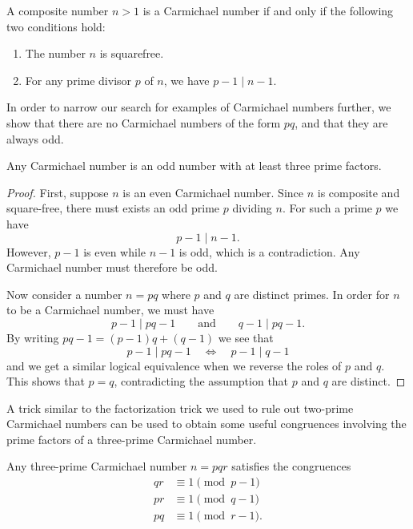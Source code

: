 \begin{theorem}
  A composite number $n>1$ is a Carmichael number if and only if the following two conditions hold:
  \begin{enumerate}
  \item The number $n$ is squarefree.
  \item For any prime divisor $p$ of $n$, we have $p-1\mid n-1$.
  \end{enumerate}
\end{theorem}

In order to narrow our search for examples of Carmichael numbers further, we show that there are no Carmichael numbers of the form $pq$, and that they are always odd.

\begin{theorem}
  Any Carmichael number is an odd number with at least three prime factors.
\end{theorem}

\begin{proof}
  First, suppose $n$ is an even Carmichael number. Since $n$ is composite and square-free, there must exists an odd prime $p$ dividing $n$. For such a prime $p$ we have
  \begin{equation*}
    p-1\mid n-1.
  \end{equation*}
  However, $p-1$ is even while $n-1$ is odd, which is a contradiction. Any Carmichael number must therefore be odd.
  
  Now consider a number $n=pq$ where $p$ and $q$ are distinct primes. In order for $n$ to be a Carmichael number, we must have
  \begin{equation*}
    p-1\mid pq-1\qquad\text{and}\qquad q-1\mid pq-1.
  \end{equation*}
  By writing $pq-1=(p-1)q + (q-1)$ we see that
  \begin{equation*}
    p-1\mid pq-1\quad\Leftrightarrow\quad p-1\mid q-1
  \end{equation*}
  and we get a similar logical equivalence when we reverse the roles of $p$ and $q$. This shows that $p=q$, contradicting the assumption that $p$ and $q$ are distinct.
\end{proof}

A trick similar to the factorization trick we used to rule out two-prime Carmichael numbers can be used to obtain some useful congruences involving the prime factors of a three-prime Carmichael number.

\begin{proposition}
  Any three-prime Carmichael number $n=pqr$ satisfies the congruences
  \begin{align*}
    qr & \equiv 1\pmod{p-1} \\
    pr & \equiv 1\pmod{q-1} \\
    pq & \equiv 1\pmod{r-1}.
  \end{align*}
\end{proposition}

